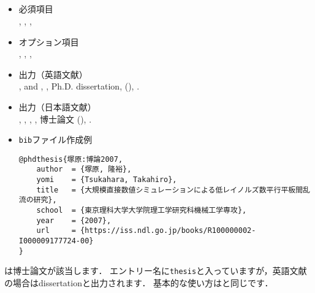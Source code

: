 \documentclass[a4paper,fleqn,uplatex,dvipdfmx]{jsarticle}
\begin{document}
\subsection{\ttphdthesis}
\label{ssec:phdthesis}
\begin{screen}
    \begin{itemize}
        \item 必須項目 \\
        \ttauthor, \tttitle, \ttschool, \ttyear
        \item オプション項目 \\
        \ttaddress, \ttmonth, \ttnote, \ttkey
        \item 出力（英語文献） \\
            \colorbox[gray]{0.8}{\ttauthorf}, \colorbox[gray]{0.8}{\ttauthors} and \colorbox[gray]{0.8}{\ttauthort}, \colorbox[gray]{0.8}{\tttitle}, Ph.D. dissertation, \colorbox[gray]{0.8}{\ttschool} (\colorbox[gray]{0.8}{\ttyear}), \colorbox[gray]{0.8}{\ttnote}.
        \item 出力（日本語文献） \\
            \colorbox[gray]{0.8}{\ttauthorf}, \colorbox[gray]{0.8}{\ttauthors}, \colorbox[gray]{0.8}{\ttauthort}, \colorbox[gray]{0.8}{\tttitle}, \colorbox[gray]{0.8}{\ttschool}博士論文 (\colorbox[gray]{0.8}{\ttyear}), \colorbox[gray]{0.8}{\ttnote}.
        \item \verb|bib|ファイル作成例 \vspace{-3mm}
\begin{verbatim}
@phdthesis{塚原:博論2007,
    author  = {塚原, 隆裕},
    yomi    = {Tsukahara, Takahiro},
    title   = {大規模直接数値シミュレーションによる低レイノルズ数平行平板間乱流の研究},
    school  = {東京理科大学大学院理工学研究科機械工学専攻},
    year    = {2007},
    url     = {https://iss.ndl.go.jp/books/R100000002-I000009177724-00}
}
\end{verbatim}
    \end{itemize}
\end{screen}

\ttphdthesis は博士論文が該当します．
エントリー名に\verb|thesis|と入っていますが，英語文献の場合はdissertationと出力されます．
基本的な使い方は\hyperref[ssec:mastersthesis]{\ttmastersthesis}と同じです．
\end{document}
